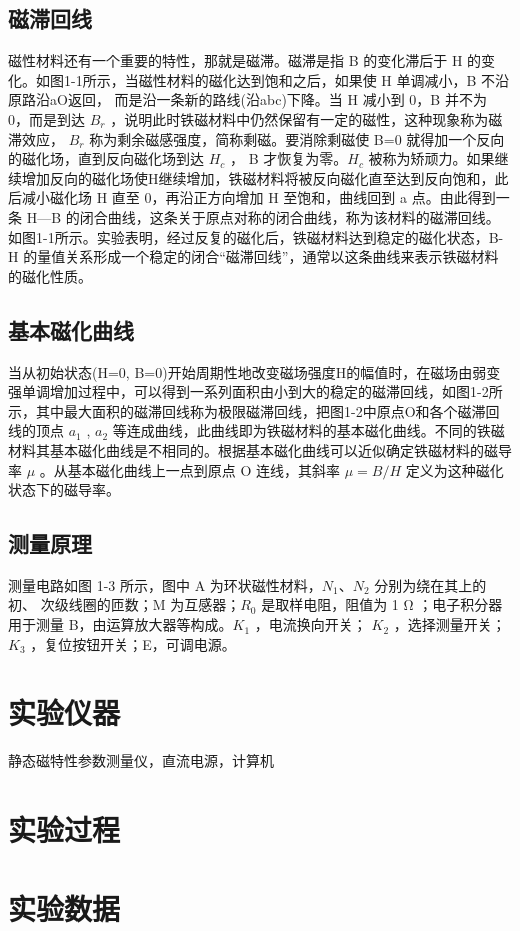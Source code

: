 \documentclass[a4paper,utf8]{article}
\begin{document}
    \subsection{磁滞回线}
        磁性材料还有一个重要的特性，那就是磁滞。磁滞是指 B 的变化滞后于 H 的变化。如图1-1所示，当磁性材料的磁化达到饱和之后，如果使 H 单调减小，B 不沿原路沿aO返回， 而是沿一条新的路线(沿abc)下降。当 H 减小到 0，B 并不为 0，而是到达 $B_r$ ，说明此时铁磁材料中仍然保留有一定的磁性，这种现象称为磁滞效应， $B_r$ 称为剩余磁感强度，简称剩磁。要消除剩磁使 B=0 就得加一个反向的磁化场，直到反向磁化场到达 $H_c$ ， B 才恢复为零。$H_c$ 被称为矫顽力。如果继续增加反向的磁化场使H继续增加，铁磁材料将被反向磁化直至达到反向饱和，此后减小磁化场 H 直至 0，再沿正方向增加 H 至饱和，曲线回到 a 点。由此得到一条 H—B 的闭合曲线，这条关于原点对称的闭合曲线，称为该材料的磁滞回线。如图1-1所示。实验表明，经过反复的磁化后，铁磁材料达到稳定的磁化状态，B-H 的量值关系形成一个稳定的闭合“磁滞回线”，通常以这条曲线来表示铁磁材料的磁化性质。
    \subsection{基本磁化曲线}
        当从初始状态(H=0, B=0)开始周期性地改变磁场强度H的幅值时，在磁场由弱变强单调增加过程中，可以得到一系列面积由小到大的稳定的磁滞回线，如图1-2所示，其中最大面积的磁滞回线称为极限磁滞回线，把图1-2中原点O和各个磁滞回线的顶点 $a_1$ , $a_2$ 等连成曲线，此曲线即为铁磁材料的基本磁化曲线。不同的铁磁材料其基本磁化曲线是不相同的。根据基本磁化曲线可以近似确定铁磁材料的磁导率 $\mu$ 。从基本磁化曲线上一点到原点 O 连线，其斜率 $μ =B/H$ 定义为这种磁化状态下的磁导率。
    \subsection{测量原理}
        测量电路如图 1-3 所示，图中 A 为环状磁性材料，$N_1$、$N_2$ 分别为绕在其上的初、 次级线圈的匝数；M 为互感器；$R_0$ 是取样电阻，阻值为 1 \unit{\ohm} ；电子积分器用于测量 B，由运算放大器等构成。$K_1$ ，电流换向开关； $K_2$ ，选择测量开关；$K_3$ ，复位按钮开关；E，可调电源。
\section{实验仪器}%
    静态磁特性参数测量仪，直流电源，计算机
\section{实验过程}%
\section{实验数据}
\end{document}
